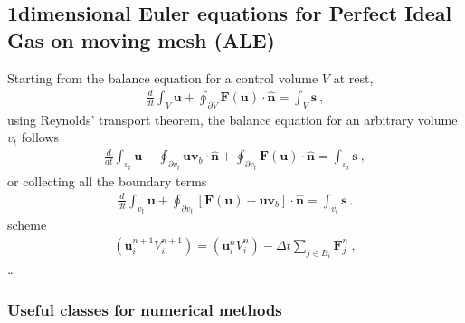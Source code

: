 \documentclass[letterpaper,10pt,english]{jupyterBook}
\begin{document}
\subsection{1\sphinxhyphen{}dimensional Euler equations for Perfect Ideal Gas on moving mesh (ALE)}
\label{\detokenize{ch/pde/euler-1d-ale-piston:dimensional-euler-equations-for-perfect-ideal-gas-on-moving-mesh-ale}}\label{\detokenize{ch/pde/euler-1d-ale-piston:pde-fvm-hyperbolic-examples-euler-1d-ale-piston}}\label{\detokenize{ch/pde/euler-1d-ale-piston::doc}}
\sphinxAtStartPar
{} Starting from the balance equation for a control volume \(V\) at rest,
\begin{equation*}
\begin{split}\frac{d}{dt}\int_{V} \mathbf{u} + \oint_{\partial V} \mathbf{F}(\mathbf{u}) \cdot \hat{\mathbf{n}} = \int_{V} \mathbf{s} \ ,\end{split}
\end{equation*}
\sphinxAtStartPar
using Reynolds’ transport theorem, the balance equation for an arbitrary volume \(v_t\) follows
\begin{equation*}
\begin{split}\frac{d}{dt}\int_{v_t} \mathbf{u} - \oint_{\partial v_t} \mathbf{u} \mathbf{v}_b \cdot \hat{\mathbf{n}} + \oint_{\partial v_t} \mathbf{F}(\mathbf{u}) \cdot \hat{\mathbf{n}} = \int_{v_t} \mathbf{s} \ ,\end{split}
\end{equation*}
\sphinxAtStartPar
or collecting all the boundary terms
\begin{equation*}
\begin{split}\frac{d}{dt}\int_{v_t} \mathbf{u} + \oint_{\partial v_t} \left[ \mathbf{F}(\mathbf{u}) - \mathbf{u} \mathbf{v}_b \right] \cdot \hat{\mathbf{n}} = \int_{v_t} \mathbf{s} \ .\end{split}
\end{equation*}
\sphinxAtStartPar
{} scheme
\begin{equation*}
\begin{split}( \mathbf{u}_i^{n+1} V_i^{n+1} ) = ( \mathbf{u}_i^{n} V_i^{n} ) - \Delta t \sum_{j \in B_i} \mathbf{F}_j^n \ ,\end{split}
\end{equation*}
\sphinxAtStartPar
{} …

\sphinxAtStartPar
{}


\subsubsection{Useful classes for numerical methods}
\label{\detokenize{ch/pde/euler-1d-ale-piston:useful-classes-for-numerical-methods}}
\end{document}
